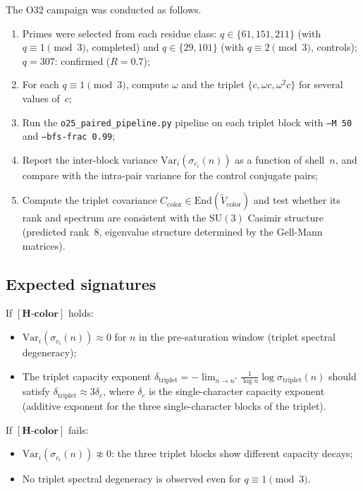 \documentclass[11pt,a4paper]{article}
\theoremstyle{definition}
\theoremstyle{remark}
\newcommand{\SU}{\mathrm{SU}}
\newcommand{\End}{\mathrm{End}}
\newcommand{\dtriplet}{\delta_{\mathrm{triplet}}}
\newcommand{\Hcolor}{\mathbf{[H\text{-}color]}}
\begin{document}
      The O32 campaign was conducted as follows.
      \begin{enumerate}[label=(\roman*)]
\item Primes were selected from each residue class: $q \in \{61, 151, 211\}$
(with $q \equiv 1 \pmod{3}$, completed) and $q \in \{29, 101\}$
(with $q \equiv 2 \pmod{3}$, controls); $q = 307$: confirmed ($R=0.7$);
\item For each $q \equiv 1 \pmod{3}$, compute $\omega$ and the triplet $\{c, \omega c, \omega^2 c\}$
for several values of~$c$;
\item Run the \texttt{o25\_paired\_pipeline.py} pipeline on each triplet block with \texttt{--M 50}
and \texttt{--bfs-frac 0.99};
\item Report the inter-block variance $\mathrm{Var}_{i}(\sigma_{c_i}(n))$ as a function of
shell~$n$, and compare with the intra-pair variance for the control conjugate pairs;
\item Compute the triplet covariance $C_{\mathrm{color}} \in \End(\tilde{V}_{\mathrm{color}})$
and test whether its rank and spectrum are consistent with the $\SU(3)$ Casimir structure
(predicted rank~8, eigenvalue structure determined by the Gell-Mann matrices).
      \end{enumerate}

    \subsection{Expected signatures}
      \label{ssec:signatures}

      If $\Hcolor$ holds:
      \begin{itemize}
        \item $\mathrm{Var}_i(\sigma_{c_i}(n)) \approx 0$ for $n$ in the pre-saturation window
        (triplet spectral degeneracy);
        \item The triplet capacity exponent $\dtriplet = -\lim_{n\to n^*} \tfrac{1}{\log n}
        \log \sigma_{\mathrm{triplet}}(n)$ should satisfy $\dtriplet \approx 3\delta_c$, where
        $\delta_c$ is the single-character capacity exponent (additive exponent for the three
        single-character blocks of the triplet).
      \end{itemize}

      If $\Hcolor$ fails:
      \begin{itemize}
        \item $\mathrm{Var}_i(\sigma_{c_i}(n)) \not\approx 0$: the three triplet blocks show different
        capacity decays;
        \item No triplet spectral degeneracy is observed even for $q \equiv 1 \pmod{3}$.
      \end{itemize}
\end{document}
